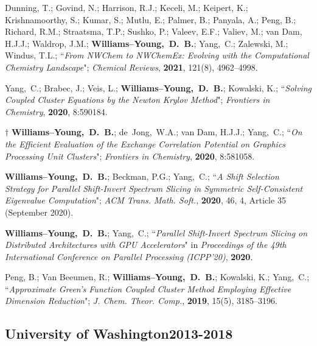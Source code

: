 \documentclass[10pt]{res} %
\newcommand*\me[0]{{\bf Williams--Young,~D.~B.}}
\newcommand*\cy[0]{Yang,~C.}
\newcommand*\bdj[0]{de~Jong,~W.A.}
\begin{document}
\begin{resume}
\begin{etaremune}
        Dunning, T.; Govind, N.; Harrison, R.J.; Keceli, M.; Keipert, K.; Krishnamoorthy, S.; Kumar, S.;
        Mutlu, E.; Palmer, B.; Panyala, A.; Peng, B.; Richard, R.M.; Straatsma, T.P.; Sushko, P.; Valeev, E.F.;
        Valiev, M.; van Dam, H.J.J.; Waldrop, J.M.; \me; \cy; Zalewski, M.; Windus, T.L.;
       ``\emph{From NWChem to NWChemEx: Evolving with the Computational Chemistry Landscape}"; \emph{Chemical Reviews},
       \textbf{2021}, 121(8), 4962--4998.
  \item \cy; Brabec, J.; Veis, L.; \me; Kowalski, K.;
        ``\emph{Solving Coupled Cluster Equations by the Newton Krylov Method}";
        \emph{Frontiers in Chemistry}, \textbf{2020}, 8:590184.
  \item $\dagger$ \me; \bdj; van Dam, H.J.J.; \cy;
        ``\emph{On the Efficient Evaluation of the Exchange Correlation Potential on Graphics Processing Unit Clusters}";
        \emph{Frontiers in Chemistry}, \textbf{2020}, 8:581058.
  \item \me; Beckman, P.G.; \cy;
        ``\emph{A Shift Selection Strategy for Parallel Shift-Invert Spectrum Slicing in Symmetric Self-Consistent 
        Eigenvalue Computation}";
        \emph{ACM Trans. Math. Soft.}, \textbf{2020}, 46, 4, Article 35 (September 2020).
  \item \me; \cy;
        ``\emph{Parallel Shift-Invert Spectrum Slicing on Distributed Architectures with GPU Accelerators}"
        in \emph{Proceedings of the 49th International Conference on Parallel Processing (ICPP'20)}, \textbf{2020}.
  \item Peng, B.; Van Beeumen, R.; \me; Kowalski, K.; \cy;
        ``\emph{Approximate Green’s Function Coupled Cluster Method Employing 
          Effective Dimension Reduction}";
        \emph{J. Chem. Theor. Comp.}, \textbf{2019}, 15(5), 3185--3196.
\end{etaremune}

\subsection{University of Washington\hfill 2013-2018}


\end{resume}
\end{document}
